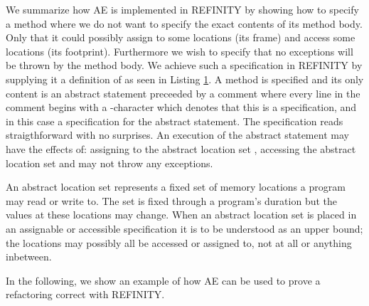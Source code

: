 We summarize how AE is implemented in REFINITY by showing how to specify a method  where we do not want to specify the exact contents of its method body.
Only that it could possibly assign to some locations (its frame) and access some locations (its footprint).
Furthermore we wish to specify that no exceptions will be thrown by the method body.
We achieve such a specification in REFINITY by supplying it a definition of  as seen in Listing \ref{lst:ExtractVariable-refinity-method}.
A method is specified and its only content is an abstract statement  preceeded by a comment where every line in the
comment begins with a -character which denotes that this is a specification, and in this case a specification for the abstract statement.
The specification reads straigthforward with no surprises. An execution of the abstract statement  may have the effects of: assigning to the
abstract location set , accessing the abstract location set  and may not throw any exceptions.

An abstract location set represents a fixed set of memory locations a program may read or write to.
The set is fixed through a program's duration but the values at these locations may change.
When an abstract location set is placed in an assignable or accessible specification it is to be understood as an upper bound;
the locations may possibly all be accessed or assigned to, not at all or anything inbetween.

\begin{figure}[h]
  \centering
  \begin{minipage}{.65\linewidth}
  
  \label{lst:ExtractVariable-refinity-method}
  \end{minipage}
\end{figure}


In the following, we show an example of how AE can be used to prove a refactoring correct with REFINITY. 

